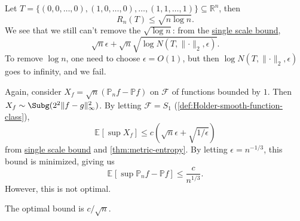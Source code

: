 \begin{eg}
	Let \(T = \{ (0, 0, \dots , 0), (1, 0, \dots , 0), \dots , (1, 1, \dots , 1) \} \subseteq \mathbb{R} ^n\), then
	\[
		R_n(T) \leq \sqrt{n \log n} .
	\]
	We see that we still can't remove the \(\sqrt{\log n}\): from the \hyperref[lma:single-scale-bound]{single scale bound},
	\[
		\sqrt{n} \epsilon + \sqrt{n} \sqrt{\log N(T, \lVert \cdot \rVert _2, \epsilon )}.
	\]
	To remove \(\log n\), one need to choose \(\epsilon = O(1)\), but then \(\log N(T, \lVert \cdot \rVert _2, \epsilon )\) goes to infinity, and we fail.
\end{eg}

\begin{eg}
	Again, consider \(X_f = \sqrt{n} (\mathbb{P} _n f - \mathbb{P} f)\) on \(\mathscr{F} \) of functions bounded by \(1\). Then \(X_f \sim \Subg(2^2 \lVert f-g \rVert _\infty ^2)\). By letting \(\mathscr{F} = S_1\) (\autoref{def:Holder-smooth-function-class}),
	\[
		\mathbb{E}_{}\left[\sup X_f \right]
		\leq c \left(  \sqrt{n} \epsilon + \sqrt{1 / \epsilon } \right)
	\]
	from \hyperref[lma:single-scale-bound]{single scale bound} and \autoref{thm:metric-entropy}. By letting \(\epsilon = n^{-1 / 3}\), this bound is minimized, giving us
	\[
		\mathbb{E}_{}\left[\sup \mathbb{P} _n f - \mathbb{P} f \right] \leq \frac{c}{n^{1 / 3}}.
	\]
	However, this is not optimal.
	\begin{remark}
		The optimal bound is \(c / \sqrt{n} \).
	\end{remark}
\end{eg}